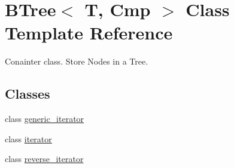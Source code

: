 \hypertarget{classBTree}{
\section{BTree$<$ T, Cmp $>$ Class Template Reference}
\label{classBTree}
}


Conainter class. Store Nodes in a Tree.  


\subsection*{Classes}
\begin{DoxyCompactItemize}
\item 
class \hyperlink{classBTree_1_1generic__iterator}{generic\_\-iterator}
\item 
class \hyperlink{classBTree_1_1iterator}{iterator}
\item 
class \hyperlink{classBTree_1_1reverse__iterator}{reverse\_\-iterator}
\end{DoxyCompactItemize}
